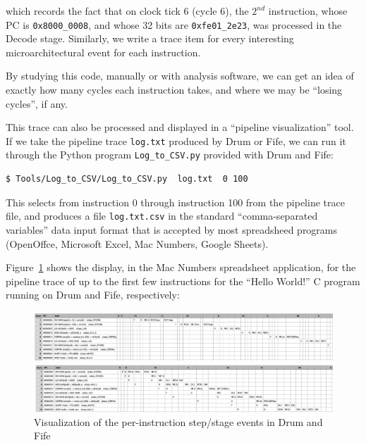 which records the fact that on clock tick 6 (cycle 6), the $2^{nd}$
instruction, whose PC is \verb|0x8000_0008|, and whose 32 bits are
\verb|0xfe01_2e23|, was processed in the Decode stage.  Similarly, we
write a trace item for every interesting microarchitectural event for
each instruction.

By studying this code, manually or with analysis software, we can get
an idea of exactly how many cycles each instruction takes, and where
we may be ``losing cycles'', if any.

This trace can also be processed and displayed in a ``pipeline
visualization'' tool.  If we take the pipeline trace \verb|log.txt|
produced by Drum or Fife, we can run it through the Python program
\verb|Log_to_CSV.py| provided with Drum and Fife:

{\small
\begin{Verbatim}[frame=single, label=log.txt]
  $ Tools/Log_to_CSV/Log_to_CSV.py  log.txt  0 100
\end{Verbatim}
}

This selects from instruction 0 through instruction 100 from the
pipeline trace file, and produces a file \verb|log.txt.csv| in the
standard ``comma-separated variables'' data input format that is
accepted by most spreadsheed programs (OpenOffce, Microsoft Excel, Mac
Numbers, Google Sheets).

Figure~\ref{Fig_PipeViz} shows the display, in the Mac Numbers
spreadsheet application, for the pipeline trace of up to the first few
instructions for the ``Hello World!'' C program running on Drum and
Fife, respectively:
\begin{figure}[htbp]
  \centerline{\includegraphics[width=6in,angle=0]{Figures/Fig_PipeViz_Drum}}
  \vspace*{1ex}
  \centerline{\includegraphics[width=6in,angle=0]{Figures/Fig_PipeViz_Fife}}
  \caption{\label{Fig_PipeViz}
           Visualization of the per-instruction step/stage events in Drum and Fife}
\end{figure}

